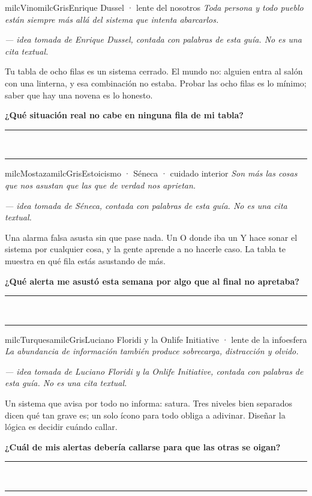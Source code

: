 \documentclass[11pt,letterpaper]{article}
\newcommand{\linead}[1]{\noindent\color{milcLinea}\rule{#1}{0.5pt}\color{milcNegro}}
\begin{document}
\begin{softbox}{milcVino}{milcGris}{Enrique Dussel · lente del nosotros}
\textit{Toda persona y todo pueblo están siempre más allá del sistema que intenta abarcarlos.}

{\footnotesize\itshape\color{milcNegro!70}--- idea tomada de Enrique Dussel, contada con palabras de esta guía. No es una cita textual.}

Tu tabla de ocho filas es un sistema cerrado. El mundo no: alguien entra al salón con una linterna, y esa combinación no estaba. Probar las ocho filas es lo mínimo; saber que hay una novena es lo honesto.

\textbf{¿Qué situación real no cabe en ninguna fila de mi tabla?}
\end{softbox}
\linead{\linewidth}\\[1mm]
\linead{\linewidth}

\begin{softbox}{milcMostaza}{milcGris}{Estoicismo · Séneca · cuidado interior}
\textit{Son más las cosas que nos asustan que las que de verdad nos aprietan.}

{\footnotesize\itshape\color{milcNegro!70}--- idea tomada de Séneca, contada con palabras de esta guía. No es una cita textual.}

Una alarma falsa asusta sin que pase nada. Un O donde iba un Y hace sonar el sistema por cualquier cosa, y la gente aprende a no hacerle caso. La tabla te muestra en qué fila estás asustando de más.

\textbf{¿Qué alerta me asustó esta semana por algo que al final no apretaba?}
\end{softbox}
\linead{\linewidth}\\[1mm]
\linead{\linewidth}

\begin{softbox}{milcTurquesa}{milcGris}{Luciano Floridi y la Onlife Initiative · lente de la infoesfera}
\textit{La abundancia de información también produce sobrecarga, distracción y olvido.}

{\footnotesize\itshape\color{milcNegro!70}--- idea tomada de Luciano Floridi y la Onlife Initiative, contada con palabras de esta guía. No es una cita textual.}

Un sistema que avisa por todo no informa: satura. Tres niveles bien separados dicen qué tan grave es; un solo ícono para todo obliga a adivinar. Diseñar la lógica es decidir cuándo callar.

\textbf{¿Cuál de mis alertas debería callarse para que las otras se oigan?}
\end{softbox}
\linead{\linewidth}\\[1mm]
\linead{\linewidth}
\end{document}
